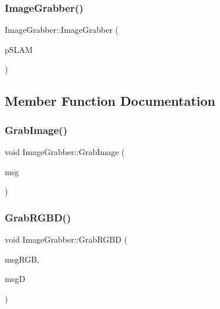 \subsubsection{\texorpdfstring{Image\+Grabber()}{ImageGrabber()}\hspace{0.1cm}{\footnotesize\ttfamily [3/3]}}
{\footnotesize\ttfamily Image\+Grabber\+::\+Image\+Grabber (\begin{DoxyParamCaption}\item[{\mbox{\hyperlink{class_o_r_b___s_l_a_m2_1_1_system}{O\+R\+B\+\_\+\+S\+L\+A\+M2\+::\+System}} $\ast$}]{p\+S\+L\+AM }\end{DoxyParamCaption})\hspace{0.3cm}{\ttfamily [inline]}}



\subsection{Member Function Documentation}
\mbox{\label{class_image_grabber_a66758ed685acbf1a7e77b3325001e47c}} 
\subsubsection{\texorpdfstring{Grab\+Image()}{GrabImage()}}
{\footnotesize\ttfamily void Image\+Grabber\+::\+Grab\+Image (\begin{DoxyParamCaption}\item[{const sensor\+\_\+msgs\+::\+Image\+Const\+Ptr \&}]{msg }\end{DoxyParamCaption})}

\mbox{\label{class_image_grabber_ab6df23b898365aa3df99628e4c925aee}} 
\subsubsection{\texorpdfstring{Grab\+R\+G\+B\+D()}{GrabRGBD()}}
{\footnotesize\ttfamily void Image\+Grabber\+::\+Grab\+R\+G\+BD (\begin{DoxyParamCaption}\item[{const sensor\+\_\+msgs\+::\+Image\+Const\+Ptr \&}]{msg\+R\+GB,  }\item[{const sensor\+\_\+msgs\+::\+Image\+Const\+Ptr \&}]{msgD }\end{DoxyParamCaption})}

